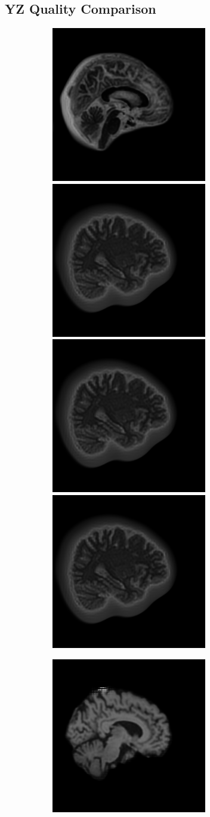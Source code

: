 \documentclass[12pt, fleqn, titlepage]{article}
\newcommand\skipper{1.4pt}
\newcommand\ripper{2.5pt}
\begin{document}
\subsection{YZ Quality Comparison}\label{yz_generated}
\begin{figure}[H]
	\centering
	\begin{subfigure}[b]{0.7\textwidth}
		\centering
		\includegraphics[width=0.22\linewidth]{imgs/1.5T_bilinear}
		\hskip\skipper
		\includegraphics[width=0.22\linewidth]{imgs/3T_bilinear}
		\hskip\skipper
		\includegraphics[width=0.22\linewidth]{imgs/3T_bilinear}
		\hskip\skipper
		\includegraphics[width=0.22\linewidth]{imgs/3T_bilinear}
	\end{subfigure}
	\vskip\ripper
	\begin{subfigure}[b]{0.7\textwidth}
		\centering
		\includegraphics[width=0.22\linewidth]{imgs/1.5T_no_noise}

\end{subfigure}
\end{figure}
\end{document}
